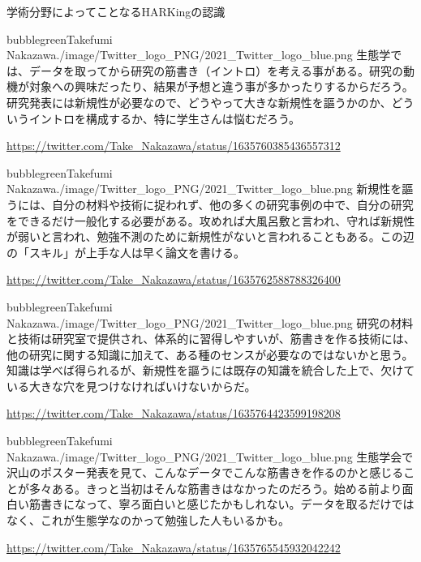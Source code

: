 \begin{SMbox}{学術分野によってことなるHARKingの認識}
 \begin{rightbubbles}{bubblegreen}{Takefumi Nakazawa}{./image/Twitter_logo_PNG/2021_Twitter_logo_blue.png}
  生態学では、データを取ってから研究の筋書き（イントロ）を考える事がある。研究の動機が対象への興味だったり、結果が予想と違う事が多かったりするからだろう。研究発表には新規性が必要なので、どうやって大きな新規性を謳うかのか、どういうイントロを構成するか、特に学生さんは悩むだろう。
  \begin{flushright}
   \small	\url{https://twitter.com/Take_Nakazawa/status/1635760385436557312}
  \end{flushright}
 \end{rightbubbles}

 \begin{rightbubbles}{bubblegreen}{Takefumi Nakazawa}{./image/Twitter_logo_PNG/2021_Twitter_logo_blue.png}
  新規性を謳うには、自分の材料や技術に捉われず、他の多くの研究事例の中で、自分の研究をできるだけ一般化する必要がある。攻めれば大風呂敷と言われ、守れば新規性が弱いと言われ、勉強不測のために新規性がないと言われることもある。この辺の「スキル」が上手な人は早く論文を書ける。
  \begin{flushright}
   \small	\url{https://twitter.com/Take_Nakazawa/status/1635762588788326400}
  \end{flushright}
 \end{rightbubbles}

 \begin{rightbubbles}{bubblegreen}{Takefumi Nakazawa}{./image/Twitter_logo_PNG/2021_Twitter_logo_blue.png}
  研究の材料と技術は研究室で提供され、体系的に習得しやすいが、筋書きを作る技術には、他の研究に関する知識に加えて、ある種のセンスが必要なのではないかと思う。知識は学べば得られるが、新規性を謳うには既存の知識を統合した上で、欠けている大きな穴を見つけなければいけないからだ。
  \begin{flushright}
   \small	\url{https://twitter.com/Take_Nakazawa/status/1635764423599198208}
  \end{flushright}
 \end{rightbubbles}

 \begin{rightbubbles}{bubblegreen}{Takefumi Nakazawa}{./image/Twitter_logo_PNG/2021_Twitter_logo_blue.png}
  生態学会で沢山のポスター発表を見て、こんなデータでこんな筋書きを作るのかと感じることが多々ある。きっと当初はそんな筋書きはなかったのだろう。始める前より面白い筋書きになって、寧ろ面白いと感じたかもしれない。データを取るだけではなく、これが生態学なのかって勉強した人もいるかも。
  \begin{flushright}
   \small	\url{https://twitter.com/Take_Nakazawa/status/1635765545932042242}
  \end{flushright}
 \end{rightbubbles}


\end{SMbox}
